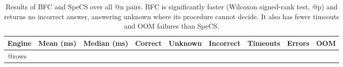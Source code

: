 \begin{table}[!t]
  \centering
  \small
  \caption{Results of \acs{BFC} and SpeCS over all @n pairs.
\acs{BFC} is significantly faster (Wilcoxon signed-rank test, @p) and returns no incorrect answer, answering unknown where its procedure cannot decide.
It also has fewer timeouts and \ac{OOM} failures than SpeCS.}
  \begin{tabular}{lrrrrrrrr}
    \toprule
    Engine & Mean (ms) & Median (ms) & Correct & Unknown & Incorrect & Timeouts & Errors & OOM \\
    \midrule
@rows
    \bottomrule
  \end{tabular}
  \label{fig:overview_bfc_specs}
\end{table}
